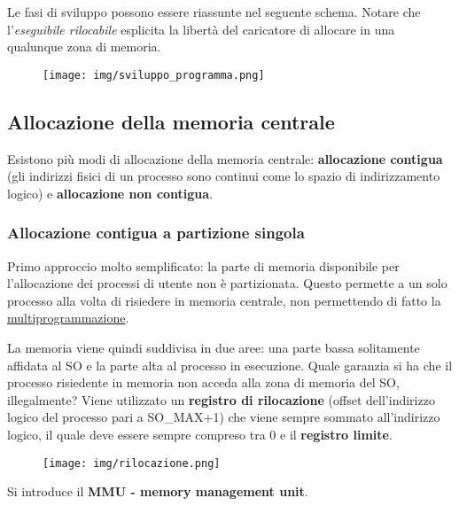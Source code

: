 \documentclass{article}
\begin{document}
\begin{itemize}
    \noindent Le fasi di sviluppo possono essere riassunte nel seguente schema. Notare che l'\textit{eseguibile rilocabile} esplicita la libertà del caricatore di allocare
    in una qualunque zona di memoria.
    \begin{figure}[h!]
        \begin{center}
            \texttt{[image: img/sviluppo\_programma.png]}     
        \end{center}
    \end{figure}
    
\end{itemize}

\subsection{Allocazione della memoria centrale}
\noindent Esistono più modi di allocazione della memoria centrale: \textbf{allocazione contigua} (gli indirizzi fisici di un processo sono continui come lo spazio di indirizzamento logico)
e \textbf{allocazione non contigua}.

\subsubsection{Allocazione contigua a partizione singola}
Primo approccio molto semplificato: la parte di memoria disponibile per l'allocazione dei processi di utente non è partizionata.
Questo permette a un solo processo alla volta di risiedere in memoria centrale, non permettendo di fatto la \underline{multiprogrammazione}.

\noindent La memoria viene quindi suddivisa in due aree: una parte bassa solitamente affidata al SO e la parte alta al processo in esecuzione.
Quale garanzia si ha che il processo risiedente in memoria non acceda alla zona di memoria del SO, illegalmente?
Viene utilizzato un \textbf{registro di rilocazione} (offset dell'indirizzo logico del processo pari a SO\_MAX+1) che viene sempre sommato all'indirizzo logico, il quale
deve essere sempre compreso tra 0 e il \textbf{registro limite}.

\begin{figure}[h!]
    \begin{center}
        \texttt{[image: img/rilocazione.png]}     
    \end{center}
\end{figure}

\noindent Si introduce il \textbf{MMU - memory management unit}. 
\end{document}
